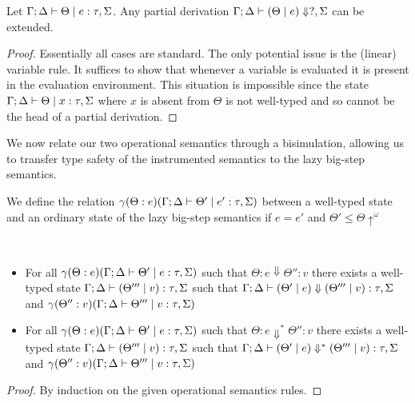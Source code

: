 \documentclass[acmsmall,review,anonymous,screen]{acmart}
\begin{document}
\begin{theorem}[Progress]\label{thm:prog}
Let $\Gamma ; \Delta \vdash \Theta \mid e : \tau,\Sigma$. Any partial derivation $\Gamma; \Delta \vdash (\Theta \mid e)
\Downarrow?,\Sigma$ can be extended. 
\end{theorem}

\begin{proof}
 Essentially all cases are standard. The only potential issue is the
 (linear) variable rule.
It suffices to show that whenever a variable is evaluated it is
present in the evaluation environment. This situation is impossible
since the state
$\Gamma ; \Delta \vdash \Theta \mid x : \tau , \Sigma$ where $x$ is absent
from $\Theta$ is not well-typed and so cannot be the head of a partial
derivation. 
\end{proof}


We now relate our two operational semantics through a bisimulation,
allowing us to transfer type safety of the instrumented semantics to
the lazy big-step semantics.

\begin{definition}[Bisimulation]
We define the relation $\gamma(\Theta : e)(\Gamma ; \Delta \vdash \Theta' \mid
e' : \tau,\Sigma)$ between a well-typed state and an ordinary state of
the lazy big-step semantics if $e = e'$ and $\Theta' \leq \Theta\uparrow^\omega$
\end{definition}

\begin{lemma}~\label{lem:naturaltoinstr}
  \begin{itemize}
    \item For all $\gamma(\Theta : e)(\Gamma ; \Delta \vdash \Theta' \mid
e : \tau,\Sigma)$ such that $\Theta : e \Downarrow \Theta'' : v$
there exists a well-typed state $\Gamma ; \Delta \vdash (\Theta''' \mid v) :
\tau,\Sigma$ such that $\Gamma ; \Delta \vdash (\Theta' \mid e) \Downarrow
(\Theta''' \mid v) : \tau,\Sigma$ and $\gamma(\Theta'' : v)(\Gamma ; \Delta
\vdash \Theta''' \mid v : \tau,\Sigma)$
\item For all $\gamma(\Theta : e)(\Gamma ; \Delta \vdash \Theta' \mid
e : \tau,\Sigma)$ such that $\Theta : e \Downarrow^* \Theta'' : v$
there exists a well-typed state $\Gamma ; \Delta \vdash (\Theta''' \mid v) :
\tau,\Sigma$ such that $\Gamma ; \Delta \vdash (\Theta' \mid e) \Downarrow^*
(\Theta''' \mid v) : \tau,\Sigma$ and $\gamma(\Theta'' : v)(\Gamma ; \Delta
\vdash \Theta''' \mid v : \tau,\Sigma)$
\end{itemize}
\end{lemma}
\begin{proof}
By induction on the given operational semantics rules.
  \end{proof}
\end{document}
